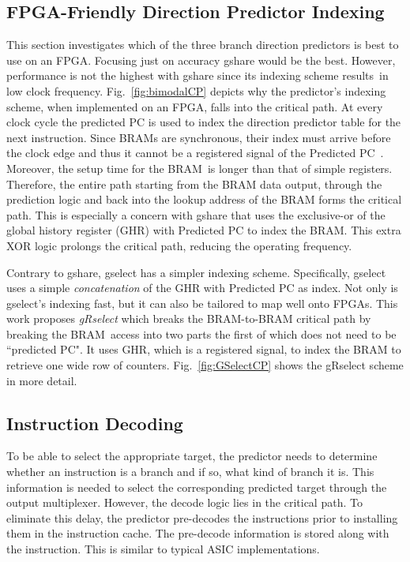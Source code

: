 \subsection{FPGA-Friendly Direction Predictor Indexing}
\label{sec:min:fpga:indexing}
This section investigates which of the three branch direction predictors is best to use on an FPGA. Focusing just on accuracy gshare would be the best. However, performance is not the highest with gshare since its indexing scheme results\ in low clock frequency. Fig.~\ref{fig:bimodalCP} depicts why the predictor's indexing scheme, when implemented on an FPGA, falls into the critical path. At every clock cycle the predicted PC is used to index the direction predictor table for the next instruction. Since BRAMs are synchronous, their index must arrive before the clock edge and thus it cannot be a registered signal of the Predicted PC~\cite{StratixIVM9K}. Moreover, the setup time for the BRAM\ is longer than that of simple registers. Therefore, the entire path starting from the BRAM data output, through the prediction logic and back into the lookup address of the BRAM forms the critical path. This is especially a concern with gshare that uses the exclusive-or of the global history register (GHR) with Predicted PC to index the BRAM. This extra XOR logic prolongs the critical path, reducing the operating frequency.

Contrary to gshare, gselect has a simpler indexing scheme. Specifically, gselect uses a simple \textit{concatenation} of the GHR with Predicted PC as index. Not only is gselect's indexing fast, but it can also  be tailored to map well onto FPGAs. This work proposes \textit{gRselect} which breaks the BRAM-to-BRAM critical path by breaking the BRAM\ access into two parts the first of which does not need to be ``predicted PC". It uses GHR, which is a registered signal, to index the BRAM to retrieve one wide row of counters. Fig.~\ref{fig:GSelectCP} shows the gRselect scheme in more detail.


\subsection{Instruction Decoding}
\label{sec:min:fpga:predecode}
To be able to select the appropriate target, the predictor needs to determine whether an instruction is a branch and if so, what kind of branch it is. This information is needed to select the corresponding predicted target through the output multiplexer. However, the decode logic lies in the critical path. To eliminate this delay, the predictor pre-decodes the instructions prior to installing them in the instruction cache. The pre-decode information is stored along with the instruction. This is similar to  typical ASIC implementations.



